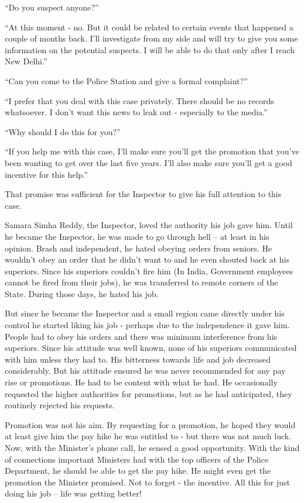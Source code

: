 “Do you suspect anyone?”

“At this moment - no. But it could be related to certain events that happened a
couple of months back. I'll investigate from my side and will try to give you
some information on the potential suspects. I will be able to do that only after
I reach New Delhi.”

“Can you come to the Police Station and give a formal complaint?”

“I prefer that you deal with this case privately. There should be no records
whatsoever. I don't want this news to leak out - especially to the media.”

“Why should I do this for you?”

“If you help me with this case, I'll make sure you'll get the promotion that
you've been wanting to get over the last five years. I'll also make sure you'll
get a good incentive for this help.”

That promise was sufficient for the Inspector to give his full attention to this
case.

Samara Simha Reddy, the Inspector, loved the authority his job gave him. Until
he became the Inspector, he was made to go through hell – at least in his
opinion. Brash and independent, he hated obeying orders from seniors. He
wouldn't obey an order that he didn't want to and he even shouted back at his
superiors. Since his superiors couldn't fire him (In India, Government employees
cannot be fired from their jobs), he was transferred to remote corners of the
State. During those days, he hated his job.

But since he became the Inspector and a small region came directly under his
control he started liking his job - perhaps due to the independence it gave him.
People had to obey his orders and there was minimum interference from his
superiors. Since his attitude was well known, none of his superiors communicated
with him unless they had to. His bitterness towards life and job decreased
considerably. But his attitude ensured he was never recommended for any pay rise
or promotions. He had to be content with what he had. He occasionally requested
the higher authorities for promotions, but as he had anticipated, they routinely
rejected his requests.

Promotion was not his aim. By requesting for a promotion, he hoped they would at
least give him the pay hike he was entitled to - but there was not much luck.
Now, with the Minister's phone call, he sensed a good opportunity. With the kind
of connections important Ministers had with the top officers of the Police
Department, he should be able to get the pay hike. He might even get the
promotion the Minister promised. Not to forget - the incentive. All this for
just doing his job – life was getting better!